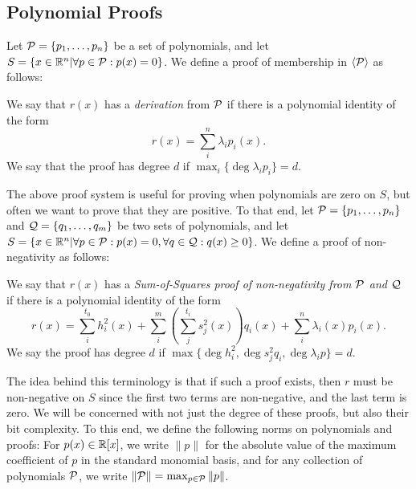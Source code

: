 \subsection{Polynomial Proofs}
Let $\mathcal P = \{p_1,\dots,p_n\}$ be a set of polynomials, and let $S = \{x \in \mathbb R^n | \forall p \in \mathcal P: p(x) = 0\}$. We define a proof of membership in $\langle \mathcal P\rangle$ as follows:
\begin{definition}
We say that $r(x)$ has a \emph{derivation} from $\mathcal P$ if there is a polynomial identity of the form
\[r(x) = \sum_{i}^n \lambda_i p_i(x).\]
We say that the proof has degree $d$ if $\max_i \{\deg \lambda_i p_i\} = d$.
\end{definition}

The above proof system is useful for proving when polynomials are zero on $S$, but often we want to prove that they are positive. To that end, let $\mathcal P = \{p_1,\dots,p_n\}$ and $\mathcal Q = \{q_1,\dots,q_m\}$ be two sets of polynomials, and let $S = \{x \in \mathbb R^n | \forall p \in \mathcal P: p(x) = 0, \forall q \in \mathcal Q: q(x) \geq 0\}$. We define a proof of non-negativity as follows:
\begin{definition}
 We say that $r(x)$ has a \emph{Sum-of-Squares proof of non-negativity from $\mathcal P$ and $\mathcal Q$} if there is a polynomial identity of the form
\[r(x) = \sum_{i}^{t_0} h_i^2(x) + \sum_{i}^m \left(\sum_{j}^{t_i} s_j^2(x)\right)q_i(x) + \sum_{i}^n \lambda_i(x) p_i(x).\]
We say the proof has degree $d$ if $\max \{\deg h_i^2, \deg s_j^2q_i, \deg \lambda_i p\} = d$.
\end{definition}
The idea behind this terminology is that if such a proof exists, then $r$ must be non-negative on $S$ since the first two terms are non-negative, and the last term is zero. We will be concerned with not just the degree of these proofs, but also their bit complexity. To this end, we define the following norms on polynomials and proofs: For $p(x) \in \mathbb R[x]$, we write $\|p\|$ for the absolute value of the maximum coefficient of $p$ in the standard monomial basis, and for any collection of polynomials $\mathcal P$, we write $\|\mathcal P\| = \max_{p \in \mathcal P} \|p\|$. 

